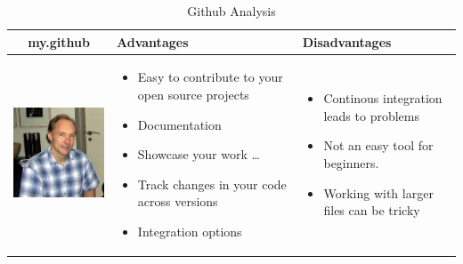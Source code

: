 \documentclass{article}
\begin{document}
	
	\begin{table}[h!]
		\centering
		\begin{tabular}{ | c | m{5cm} | m{5cm} | }
			\hline
			my.github & Advantages & Disadvantages \\ \hline
			\begin{minipage}{.4\textwidth}
				\includegraphics[width=\linewidth, height=40mm]{picture1}
			\end{minipage}
		    &
		    \begin{itemize}
		    	\item Easy to contribute to your open source projects
		    	\item Documentation
		        \item Showcase your work \ldots
		        \item Track changes in your code across versions   
		    	\item Integration options
		    \end{itemize}
	    &
	    \begin{itemize}
	    	\item Continous integration leads to problems
	    	\item Not an easy tool for beginners.
	    	\item Working with larger files can be tricky
	    \end{itemize}
	    \\ \hline
	\end{tabular}
\caption{Github Analysis}\label{tbl:mygitHub}
\end{table}
\end{document}
